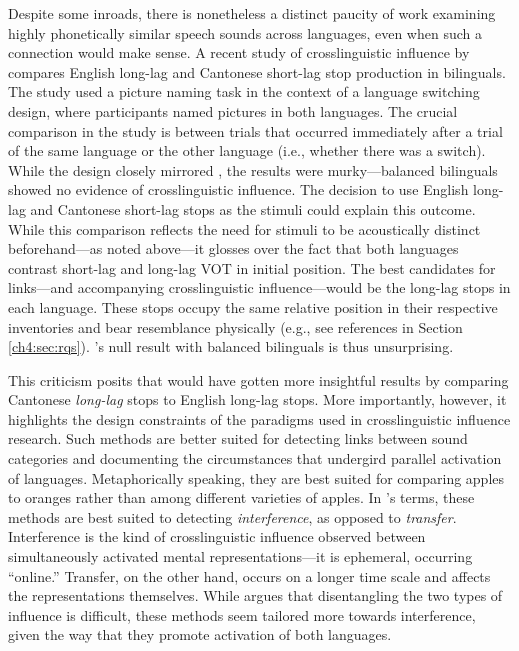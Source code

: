 Despite some inroads, there is nonetheless a distinct paucity of work examining highly phonetically similar speech sounds across languages, even when such a connection would make sense. A recent study of crosslinguistic influence by \citet{tsui_2019_switching} compares English long-lag and Cantonese short-lag stop production in bilinguals. The study used a picture naming task in the context of a language switching design, where participants named pictures in both languages. The crucial comparison in the study is between trials that occurred immediately after a trial of the same language or the other language (i.e., whether there was a switch). While the design closely mirrored \citet{goldrick_2014_switching}, the results were murky---balanced bilinguals showed no evidence of crosslinguistic influence. The decision to use English long-lag and Cantonese short-lag stops as the stimuli could explain this outcome. While this comparison reflects the need for stimuli to be acoustically distinct beforehand---as noted above---it glosses over the fact that both languages contrast short-lag and long-lag VOT in initial position. The best candidates for links---and accompanying crosslinguistic influence---would be the long-lag stops in each language. These stops occupy the same relative position in their respective inventories and bear resemblance physically (e.g., see references in Section \ref{ch4:sec:rqs}). \citeauthor{tsui_2019_switching}'s \citeyearpar{tsui_2019_switching} null result with balanced bilinguals is thus unsurprising. 

This criticism posits that \citep{tsui_2019_switching} would have gotten more insightful results by comparing Cantonese \textit{long-lag} stops to English long-lag stops. More importantly, however, it highlights the design constraints of the paradigms used in crosslinguistic influence research. Such methods are better suited for detecting links between sound categories and documenting the circumstances that undergird parallel activation of languages. Metaphorically speaking, they are best suited for comparing apples to oranges rather than among different varieties of apples. In \citeauthor{grosjean_2011_transfer}'s \citeyearpar{grosjean_2011_transfer} terms, these methods are best suited to detecting \textit{interference}, as opposed to \textit{transfer}. Interference is the kind of crosslinguistic influence observed between simultaneously activated mental representations---it is ephemeral, occurring ``online.'' Transfer, on the other hand, occurs on a longer time scale and affects the representations themselves. While \citet{grosjean_2011_transfer} argues that disentangling the two types of influence is difficult, these methods seem tailored more towards interference, given the way that they promote activation of both languages.

